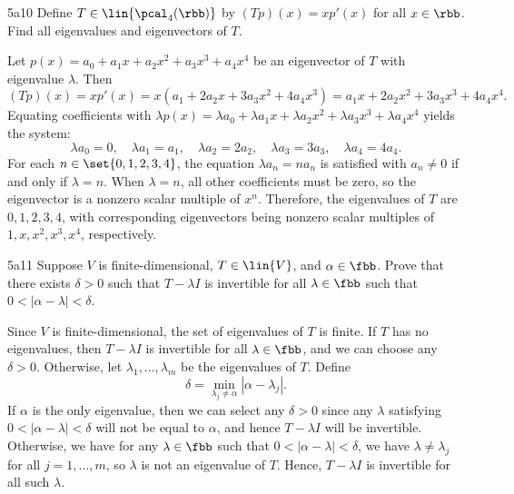 \begin{exercise}{5a10}
    Define $T \in \lin{\pcal_4(\rbb)}$ by $(Tp)(x) = xp'(x)$ for all $x \in \rbb$.
	Find all eigenvalues and eigenvectors of $T$.
\end{exercise}

\begin{sol}
    Let $p(x) = a_0 + a_1x + a_2x^2 + a_3x^3 + a_4x^4$ be an eigenvector of $T$ with eigenvalue $\lambda$.
    Then
    \[
    	(Tp)(x) = xp'(x) = x(a_1 + 2a_2x + 3a_3x^2 + 4a_4x^3) = a_1x + 2a_2x^2 + 3a_3x^3 + 4a_4x^4.
    \]
    Equating coefficients with $\lambda p(x) = \lambda a_0 + \lambda a_1x + \lambda a_2x^2 + \lambda a_3x^3 + \lambda a_4x^4$ yields the system:
    \[
    	\lambda a_0 = 0, \quad \lambda a_1 = a_1, \quad \lambda a_2 = 2a_2, \quad \lambda a_3 = 3a_3, \quad \lambda a_4 = 4a_4.
    \]
    For each $n \in \set{0, 1, 2, 3, 4}$, the equation $\lambda a_n = n a_n$ is satisfied with $a_n \neq 0$ if and only if $\lambda = n$.
    When $\lambda = n$, all other coefficients must be zero, so the eigenvector is a nonzero scalar multiple of $x^n$.
    Therefore, the eigenvalues of $T$ are $0, 1, 2, 3, 4$, with corresponding eigenvectors being nonzero scalar multiples of $1, x, x^2, x^3, x^4$, respectively.
\end{sol}

\begin{exercise}{5a11}
    Suppose $V$ is finite-dimensional, $T \in \lin{V}$, and $\alpha \in \fbb$.
	Prove that there exists $\delta > 0$ such that $T - \lambda I$ is invertible for all $\lambda \in \fbb$ such that $0 < |\alpha - \lambda| < \delta$.
\end{exercise}

\begin{sol}
    Since $V$ is finite-dimensional, the set of eigenvalues of $T$ is finite.
	If $T$ has no eigenvalues, then $T - \lambda I$ is invertible for all $\lambda \in \fbb$, and we can choose any $\delta > 0$.
	Otherwise, let $\lambda_1, \ldots, \lambda_m$ be the eigenvalues of $T$.
	Define
    \[
    	\delta = \min_{\lambda_j \neq \alpha} |\alpha - \lambda_j|.
    \]
    If $\alpha$ is the only eigenvalue, then we can select any $\delta > 0$ since any $\lambda$ satisfying $0 < |\alpha - \lambda| < \delta$ will not be equal to $\alpha$, and hence $T - \lambda I$ will be invertible.
	Otherwise, we have for any $\lambda \in \fbb$ such that $0 < |\alpha - \lambda| < \delta$, we have $\lambda \neq \lambda_j$ for all $j = 1, \ldots, m$, so $\lambda$ is not an eigenvalue of $T$.
	Hence, $T - \lambda I$ is invertible for all such $\lambda$.
\end{sol}

